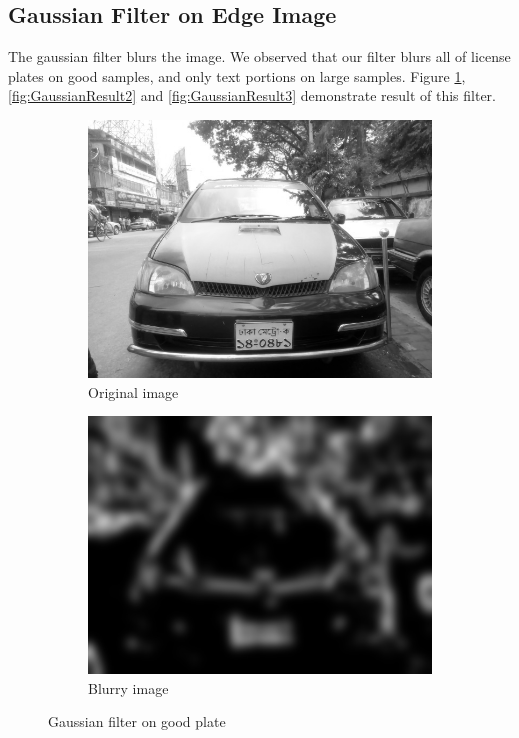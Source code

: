 \subsection{Gaussian Filter on Edge Image}
The gaussian filter blurs the image. We observed that our filter blurs all of license plates on good samples, and only text portions on large samples. Figure \ref{fig:GaussianResult1}, \ref{fig:GaussianResult2} and \ref{fig:GaussianResult3} demonstrate result of this filter.

\begin{figure}
\begin{subfigure}{0.5\textwidth}
    \centering
    \includegraphics[width=0.9\linewidth]{./img/experiment/stage.2/good3}
    \caption{Original image}
\end{subfigure}
\begin{subfigure}{0.5\textwidth}
    \centering
    \includegraphics[width=0.9\linewidth]{./img/experiment/stage.4/good3}
    \caption{Blurry image}
\end{subfigure}
\caption{Gaussian filter on good plate}
\label{fig:GaussianResult1}
\end{figure}

